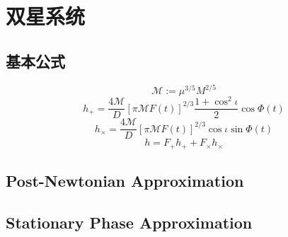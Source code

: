 \chapter{双星系统}

\section{基本公式}

\def\M{\mathcal{M}}
\begin{equation}
    \M:=\mu^{3/5}M^{2/5}
\end{equation}
\begin{equation}
    h_+=\frac{4\M}{D}[\pi \M F(t)]^{2/3}\frac{1+\cos^2\iota}{2}\cos\Phi(t)
\end{equation}
\begin{equation}
    h_\times=\frac{4\M}{D}[\pi \M F(t)]^{2/3}\cos\iota\sin\Phi(t)
\end{equation}
\begin{equation}
    h=F_+h_++F_\times h_\times
\end{equation}

\section{Post-Newtonian Approximation}

\section{Stationary Phase Approximation}

